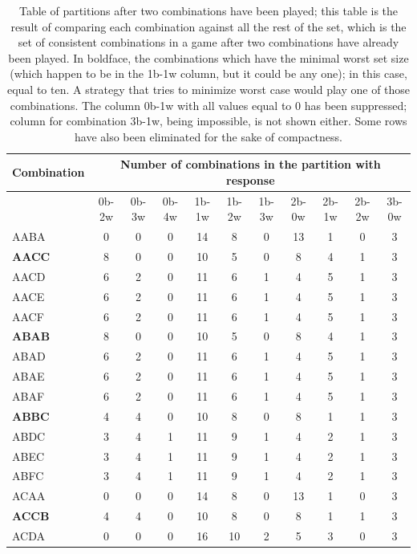\documentclass[preprint,12pt]{elsarticle}
\begin{document}
%
\begin{table}[htb!]
\caption{Table of partitions after two combinations have been played;
  this table is the result of comparing each combination against all
  the rest of the set, which is the set of consistent combinations in
  a game after two combinations have already been played. In boldface,
  the combinations which have the minimal worst set size (which happen to be in the 1b-1w column, but it could be any one); in this
  case, equal to ten. A strategy that tries to minimize worst case
  would play one of those combinations. The column 0b-1w with all values equal
  to 0 has been suppressed; column for combination 3b-1w, being impossible, is
  not shown either. Some rows have also been eliminated for the sake
  of compactness.  \label{tab:partitions}}
\small
\centering
\tiny
\begin{tabular}{|l|c|c|c|c|c|c|c|c|c|c|}
\hline
Combination & \multicolumn{10}{|c|}{Number of combinations in the
  partition with response} \\
\hline
 &0b-2w& 0b-3w& 0b-4w& 1b-1w& 1b-2w& 1b-3w& 2b-0w& 2b-1w& 2b-2w& 3b-0w\\
AABA &0 & 0 & 0 & 14 & 8 & 0 & 13 & 1 & 0 & 3 \\
{\bf AACC} &8 & 0 & 0 & 10 & 5 & 0 & 8 & 4 & 1 & 3 \\
AACD &6 & 2 & 0 & 11 & 6 & 1 & 4 & 5 & 1 & 3 \\
AACE &6 & 2 & 0 & 11 & 6 & 1 & 4 & 5 & 1 & 3 \\
AACF &6 & 2 & 0 & 11 & 6 & 1 & 4 & 5 & 1 & 3 \\
{\bf ABAB} &8 & 0 & 0 & 10 & 5 & 0 & 8 & 4 & 1 & 3 \\
ABAD &6 & 2 & 0 & 11 & 6 & 1 & 4 & 5 & 1 & 3 \\
ABAE &6 & 2 & 0 & 11 & 6 & 1 & 4 & 5 & 1 & 3 \\
ABAF &6 & 2 & 0 & 11 & 6 & 1 & 4 & 5 & 1 & 3 \\
{\bf ABBC} &4 & 4 & 0 & 10 & 8 & 0 & 8 & 1 & 1 & 3 \\
ABDC &3 & 4 & 1 & 11 & 9 & 1 & 4 & 2 & 1 & 3 \\
ABEC &3 & 4 & 1 & 11 & 9 & 1 & 4 & 2 & 1 & 3 \\
ABFC &3 & 4 & 1 & 11 & 9 & 1 & 4 & 2 & 1 & 3 \\
ACAA &0 & 0 & 0 & 14 & 8 & 0 & 13 & 1 & 0 & 3 \\
{\bf ACCB} &4 & 4 & 0 & 10 & 8 & 0 & 8 & 1 & 1 & 3 \\
ACDA &0 & 0 & 0 & 16 & 10 & 2 & 5 & 3 & 0 & 3 \\

\end{tabular}
\end{table}
\end{document}
